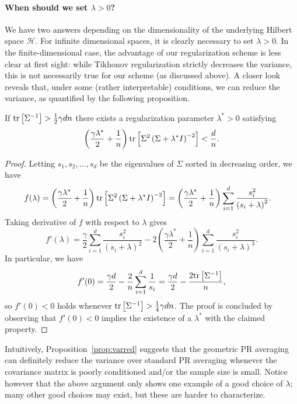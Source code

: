 \documentclass[final,12pt]{colt2018} %
\newcommand{\HH}{\mathcal{H}}
\newcommand{\trace}[1]{\mbox{\normalfont tr}\left[#1\right]}
\newcommand{\pa}[1]{\left(#1\right)}
\begin{document}
\paragraph{When should we set $\lambda > 0$?} We have two answers depending on the dimensionality of the underlying Hilbert space $\HH$. 
For infinite dimensional spaces, it is clearly necessary to set $\lambda > 0$.
In the finite-dimensional case, the advantage of our regularization scheme is less clear at first sight: while Tikhonov regularization 
strictly decreases the variance, this is not necessarily true for our scheme (as discussed above). A closer look reveals that, 
under some (rather interpretable) conditions, we can reduce the variance, as quantified by the following proposition.
\begin{proposition}\label{prop:varred}
 If $\trace{\Sigma^{-1}} > \frac 12 \gamma d n$ there exists a regularization parameter $\lambda^*>0$ satisfying
 \[
  \pa{\frac{\gamma \lambda^*}{2} + \frac{1}{n}}\trace{\Sigma^2 \pa{\Sigma + \lambda^*I}^{-2}} < \frac{d}{n}.
 \]
\end{proposition}
\begin{proof}
 Letting $s_1,s_2,\dots,s_d$ be the eigenvalues of $\Sigma$ sorted in decreasing order, we have
 \begin{align*}
  f(\lambda) = \pa{\frac{\gamma \lambda^*}{2} + \frac{1}{n}}\trace{\Sigma^2 \pa{\Sigma + \lambda^*I}^{-2}} &= 
  \pa{\frac{\gamma \lambda^*}{2} + \frac{1}{n}} \sum_{i=1}^d \frac{s_i^2}{\pa{s_i+\lambda}^2}.
 \end{align*}
Taking derivative of $f$ with respect to $\lambda$ gives
\[
  f'(\lambda) = \frac{\gamma}{2} \sum_{i=1}^d \frac{s_i^2}{\pa{s_i+\lambda}^2} - 2 \pa{\frac{\gamma \lambda^*}{2} + \frac{1}{n}} 
\sum_{i=1}^d 
\frac{s_i^2}{\pa{s_i+\lambda}^3}.
\]
In particular, we have
\[
 f'(0) = \frac{\gamma d}{2} - \frac{2}{n}\sum_{i=1}^d \frac{1}{s_i} = \frac{\gamma d}{2} - \frac{2\trace{\Sigma^{-1}}}{n},
\]
so $f'(0)<0$ holds whenever $\trace{\Sigma^{-1}} > \frac 14 \gamma d n$.
The proof is concluded by observing that $f'(0)<0$ implies the existence of a $\lambda^*$ with the claimed property.
\end{proof}
Intuitively, Proposition~\ref{prop:varred} suggests that the geometric PR averaging can definitely reduce the variance over standard 
PR averaging whenever the covariance matrix is poorly conditioned and/or the sample size is small. Notice however that 
the above argument only shows one example of a good choice of $\lambda$; many other good choices may exist, but these are harder to 
characterize.
\end{document}
